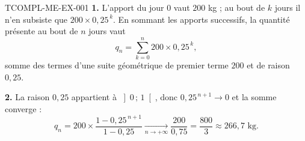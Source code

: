 \begin{corrige}{TCOMPL-ME-EX-001}
\textbf{1.} L'apport du jour $0$ vaut $200$ kg ; au bout de $k$ jours il n'en
subsiste que $200\times0{,}25^{\,k}$. En sommant les apports successifs, la
quantité présente au bout de $n$ jours vaut
\[
  q_n = \sum_{k=0}^{n} 200\times0{,}25^{\,k},
\]
somme des termes d'une suite géométrique de premier terme $200$ et de raison
$0{,}25$.

\textbf{2.} La raison $0{,}25$ appartient à $\left]0\,;\,1\right[$, donc
$0{,}25^{\,n+1}\to0$ et la somme converge :
\[
  q_n = 200\times\frac{1-0{,}25^{\,n+1}}{1-0{,}25}
  \xrightarrow[n\to+\infty]{} \frac{200}{0{,}75}
  = \frac{800}{3} \approx 266{,}7 \text{ kg}.
\]
\end{corrige}
